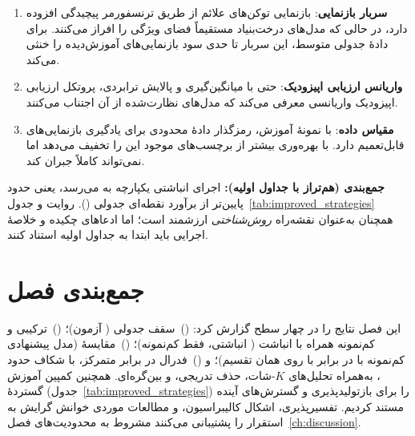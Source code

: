 \begin{enumerate}
\item \textbf{سربار بازنمایی}: بازنمایی توکن‌های علائم از طریق ترنسفورمر پیچیدگی افزوده دارد، در حالی که مدل‌های درخت‌بنیاد مستقیماً فضای ویژگی را افراز می‌کنند. برای دادۀ جدولی متوسط، این سربار تا حدی سود بازنمایی‌های آموزش‌دیده را خنثی می‌کند.
\item \textbf{واریانس ارزیابی اپیزودیک}: حتی با میانگین‌گیری  و پالایش ترابردی، پروتکل ارزیابی اپیزودیک واریانسی معرفی می‌کند که مدل‌های نظارت‌شده از آن اجتناب می‌کنند.
\item \textbf{مقیاس داده}: با  نمونۀ آموزش، رمزگذار دادۀ محدودی برای یادگیری بازنمایی‌های قابل‌تعمیم دارد.  با بهره‌وری بیشتر از برچسب‌های موجود این را تخفیف می‌دهد اما نمی‌تواند کاملاً جبران کند.
\end{enumerate}

\textbf{جمع‌بندی (هم‌تراز با جداول اولیه):} اجرای انباشتی یکپارچه به  \textbf{} می‌رسد، یعنی حدود  پایین‌تر از برآورد نقطه‌ای جدولی  (\textbf{}). روایت  و جدول~\ref{tab:improved_strategies} همچنان به‌عنوان نقشه‌راه \emph{روش‌شناختی} ارزشمند است؛ اما ادعاهای چکیده و خلاصۀ اجرایی باید ابتدا به جداول اولیه استناد کنند.

\section{جمع‌بندی فصل}

این فصل نتایج را در چهار سطح گزارش کرد: ()~سقف جدولی  (\textbf{}  آزمون)؛ ()~ترکیبی و کم‌نمونه همراه با انباشت (\textbf{} انباشتی، \textbf{} فقط کم‌نمونه)؛ ()~مقایسۀ  (مدل پیشنهادی کم‌نمونه با \textbf{} در برابر  با \textbf{} روی همان تقسیم)؛ و ()~فدرال در برابر متمرکز، با شکاف حدود \textbf{} ، به‌همراه تحلیل‌های $K$-شات، حذف تدریجی، و بین‌گره‌ای. همچنین کمپین آموزش گستردۀ  (جدول~\ref{tab:improved_strategies}) را برای بازتولیدپذیری و گسترش‌های آینده مستند کردیم. تفسیرپذیری، اشکال کالیبراسیون، و مطالعات موردی خوانش گرایش به استقرار را پشتیبانی می‌کنند مشروط به محدودیت‌های فصل~\ref{ch:discussion}.
